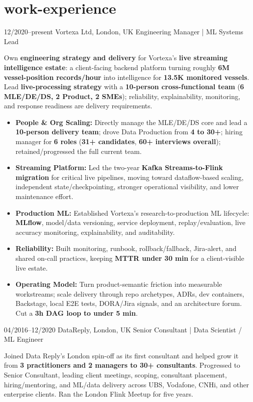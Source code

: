 \documentclass[]{../../../../friggeri-cv}
\begin{document}
\section{work-experience}
\begin{entrylist}
	\entry
	{12/2020–present}
	{Vortexa Ltd, London, UK}
		{Engineering Manager | ML Systems Lead}
	{
	{\small
	    \setlength{\parindent}{0pt}
	    \setlength{\leftskip}{0pt}
								    Own \textbf{engineering strategy and delivery} for Vortexa's \textbf{live streaming intelligence estate}: a client-facing backend platform turning roughly \textbf{6M vessel-position records/hour} into intelligence for \textbf{13.5K monitored vessels}. Lead \textbf{live-processing strategy} with a \textbf{10-person cross-functional team} (\textbf{6 MLE/DE/DS, 2 Product, 2 SMEs}); reliability, explainability, monitoring, and response readiness are delivery requirements.

	}
	    \begin{itemize}[leftmargin=1.1em]
											        \item \small\textbf{People \& Org Scaling:} Directly manage the MLE/DE/DS core and lead a \textbf{10-person delivery team}; drove Data Production from \textbf{4 to 30+}; hiring manager for \textbf{6 roles} (\textbf{31+ candidates}, \textbf{60+ interviews overall}); retained/progressed the full current team.
											        \item \small\textbf{Streaming Platform:} Led the two-year \textbf{Kafka Streams-to-Flink migration} for critical live pipelines, moving toward dataflow-based scaling, independent state/checkpointing, stronger operational visibility, and lower maintenance effort.
										        \item \small\textbf{Production ML:} Established Vortexa's research-to-production ML lifecycle: \textbf{MLflow}, model/data versioning, service deployment, replay/evaluation, live accuracy monitoring, explainability, and auditability.
									        \item \small\textbf{Reliability:} Built monitoring, runbook, rollback/fallback, Jira-alert, and shared on-call practices, keeping \textbf{MTTR under 30 min} for a client-visible live estate.
								        \item \small\textbf{Operating Model:} Turn product-semantic friction into measurable workstreams; scale delivery through repo archetypes, ADRs, dev containers, Backstage, local E2E tests, DORA/Jira signals, and an architecture forum. Cut a \textbf{3h DAG loop to under 5 min}.
	\end{itemize}
	}
    \entry
    {04/2016–12/2020}
    {DataReply, London, UK}
    {Senior Consultant | Data Scientist / ML Engineer}
    {
        {\small
        \setlength{\parindent}{0pt}
        \setlength{\leftskip}{0pt}
					        Joined Data Reply's London spin-off as its first consultant and helped grow it from \textbf{3 practitioners and 2 managers to 30+ consultants}. Progressed to Senior Consultant, leading client meetings, scoping, consultant placement, hiring/mentoring, and ML/data delivery across UBS, Vodafone, CNHi, and other enterprise clients. Ran the London Flink Meetup for five years.

}}
\end{entrylist}
\end{document}
